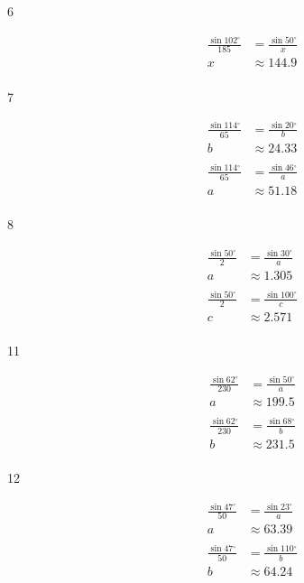 \documentclass{exam}
\newcommand{\dg}{\ensuremath{^\circ}}
\begin{document}
\begin{description}
      \item[6] 
        \begin{align*}
          \frac{\sin 102 \dg}{185} & = \frac{\sin 50 \dg}{x} \\
          x                        & \approx \boxed{ 144.9 } \\
        \end{align*}

      \item[7] 
        \begin{align*}
          \frac{\sin 114 \dg}{65} & = \frac{\sin 20 \dg}{b} \\
          b                       & \approx \boxed{ 24.33 } \\
          \\
          \frac{\sin 114 \dg}{65} & = \frac{\sin 46 \dg}{a} \\
          a                       & \approx \boxed{ 51.18 } \\
        \end{align*}

      \item[8] 
        \begin{align*}
          \frac{\sin 50 \dg}{2} & = \frac{\sin 30 \dg}{a} \\
          a                       & \approx \boxed{ 1.305 } \\
          \\
          \frac{\sin 50 \dg}{2} & = \frac{\sin 100 \dg}{c} \\
          c                       & \approx \boxed{ 2.571 } \\
        \end{align*}

      \item[11] 
        \begin{align*}
          \frac{\sin 62 \dg}{230} & = \frac{\sin 50 \dg}{a} \\
          a                       & \approx \boxed{ 199.5 } \\
          \\
          \frac{\sin 62 \dg}{230} & = \frac{\sin 68 \dg}{b} \\
          b                       & \approx \boxed{ 231.5 } \\
        \end{align*}

      \item[12] 
        \begin{align*}
          \frac{\sin 47 \dg}{50} & = \frac{\sin 23 \dg}{a} \\
          a                      & \approx \boxed{ 63.39 } \\
          \\
          \frac{\sin 47 \dg}{50} & = \frac{\sin 110 \dg}{b} \\
          b                       & \approx \boxed{ 64.24 } \\
        \end{align*}


\end{description}
\end{document}

